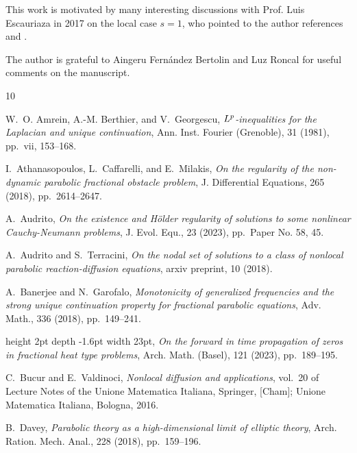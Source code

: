 \documentclass[11pt, twoside, notitlepage]{amsart}
\numberwithin{equation}{section}
\begin{document}
\bigskip

\bigskip

 This work is motivated by many interesting discussions with Prof.  Luis Escauriaza in 2017 on the local case $s=1$, who pointed to the author references \cite{DaveyARMA2018} and \cite{EilertsenJFA2001}.

The author is grateful to Aingeru Fernández Bertolin and  Luz Roncal for useful comments on the manuscript.



\begin{thebibliography}{10}

{\sc W.~O. Amrein, A.-M. Berthier, and V.~Georgescu}, {\em
  {$L\sp{p}$}-inequalities for the {L}aplacian and unique continuation}, Ann.
  Inst. Fourier (Grenoble), 31 (1981), pp.~vii, 153--168.

{\sc I.~Athanasopoulos, L.~Caffarelli, and E.~Milakis}, {\em On the regularity
  of the non-dynamic parabolic fractional obstacle problem}, J. Differential
  Equations, 265 (2018), pp.~2614--2647.

{\sc A.~Audrito}, {\em On the existence and {H}\"{o}lder regularity of
  solutions to some nonlinear {C}auchy-{N}eumann problems}, J. Evol. Equ., 23
  (2023), pp.~Paper No. 58, 45.

{\sc A.~Audrito and S.~Terracini}, {\em On the nodal set of solutions to a
  class of nonlocal parabolic reaction-diffusion equations}, arxiv preprint, 10
  (2018).

{\sc A.~Banerjee and N.~Garofalo}, {\em Monotonicity of generalized frequencies
  and the strong unique continuation property for fractional parabolic
  equations}, Adv. Math., 336 (2018), pp.~149--241.

\leavevmode\vrule height 2pt depth -1.6pt width 23pt, {\em On the forward in
  time propagation of zeros in fractional heat type problems}, Arch. Math.
  (Basel), 121 (2023), pp.~189--195.

{\sc C.~Bucur and E.~Valdinoci}, {\em Nonlocal diffusion and applications},
  vol.~20 of Lecture Notes of the Unione Matematica Italiana, Springer, [Cham];
  Unione Matematica Italiana, Bologna, 2016.

{\sc B.~Davey}, {\em Parabolic theory as a high-dimensional limit of elliptic
  theory}, Arch. Ration. Mech. Anal., 228 (2018), pp.~159--196.


\end{thebibliography}
\end{document}
